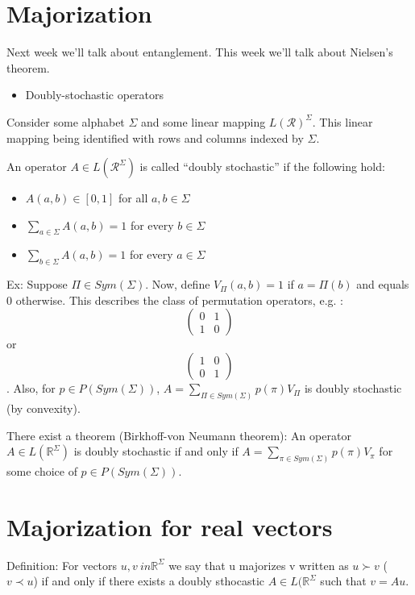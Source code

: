 \documentclass{article}
\begin{document}
    \section{Majorization}
    Next week we'll talk about entanglement. This week we'll talk about
    Nielsen's theorem.
    \begin{itemize}
        \item Doubly-stochastic operators
    \end{itemize}
    Consider some alphabet $\Sigma$ and some linear mapping
    $L(\mathcal{R})^\Sigma $. This linear mapping being identified with
    rows and columns indexed by $\Sigma$.

    An operator $A \in L(\mathcal{R}^\Sigma)$ is called ``doubly stochastic'' if
    the following hold:
    \begin{itemize}
        \item $A(a,b) \in [0,1]$ for all $a,b \in \Sigma$
        \item $\sum\limits_{a\in\Sigma} A(a,b) = 1$ for every $b\in\Sigma$
        \item $\sum\limits_{b\in\Sigma} A(a,b) = 1$ for every $ a \in \Sigma $ 
    \end{itemize}

    Ex: Suppose $\Pi \in Sym(\Sigma)$. Now, define $ V_\Pi(a,b) = 1 $ if $a =
    \Pi(b)$ and equals $0$ otherwise. This describes the class of permutation
    operators, e.g. : $$\begin{pmatrix} 0 & 1 \\ 1 & 0 \end{pmatrix}$$ or 
    $$\begin{pmatrix} 1 & 0 \\ 0 & 1 \end{pmatrix}$$.
    Also, for $p\in P(Sym(\Sigma))$, $A = \sum\limits_{\Pi \in Sym(\Sigma)}
    p(\pi)V_\Pi$ is doubly stochastic (by convexity).

    There exist a theorem (Birkhoff-von Neumann theorem):
    An operator $A\in L(\mathbb{R}^\Sigma)$ is doubly stochastic if and only if
    $A = \sum\limits_{\pi \in Sym(\Sigma)} p(\pi)V_\pi$ for some choice of $p
    \in P(Sym(\Sigma))$.

    \section{Majorization for real vectors}
    Definition: For vectors $u,v \ in \mathbb{R}^\Sigma$ we say that u majorizes
    v written as $ u \succ v$ ($v \prec u$) if and only if there exists a doubly
    sthocastic $A \in L(\mathbb{R}^\Sigma$ such that $v = Au$.
\end{document}
